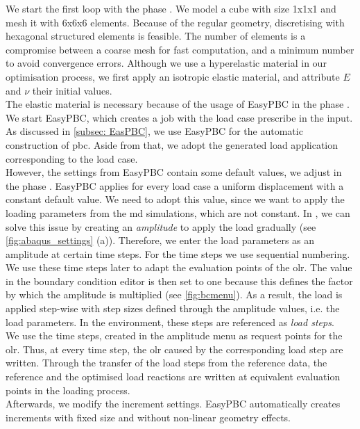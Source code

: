 We start the first loop with the phase . We model a cube with size 1x1x1 and mesh it with 6x6x6 elements. Because of the regular geometry, discretising with hexagonal structured elements is feasible.
The number of elements is a compromise between a coarse mesh for fast computation, and a minimum number to avoid convergence errors.
Although we use a hyperelastic material in our optimisation process, we first apply an isotropic elastic material, and attribute $E$ and $\nu$ their initial values. \\
\indent The elastic material is necessary because of the usage of EasyPBC in the phase .
We start EasyPBC, which creates a job with the load case prescribe in the input.
As discussed in \autoref{subsec: EasPBC}, we use EasyPBC for the automatic construction of \acrshort{pbc}. Aside from that, we adopt the generated load application corresponding to the load case. \\
\indent However, the settings from EasyPBC contain some default values, we adjust in the phase . EasyPBC applies for every load case a uniform displacement with a constant default value.
We need to adopt this value, since we want to apply the loading parameters from the \acrshort{md} simulations, which are not constant.
In , we can solve this issue by creating an \emph{amplitude} to apply the load gradually (see \autoref{fig:abaqus_settings} (a)).
Therefore, we enter the load parameters as an amplitude at certain time steps.
For the time steps we use sequential numbering. We use these time steps later to adapt the evaluation points of the \acrlong{olr}.
The value in the boundary condition editor is then set to one because this defines the factor by which the amplitude is multiplied (see \autoref{fig:bcmenu}).
As a result, the load is applied step-wise with step sizes defined through the amplitude values, i.e. the load parameters. 
In the  environment, these steps are referenced as \emph{load steps}.\\
\indent We use the time steps, created in the amplitude menu as request points for the \acrlong{olr}.
Thus, at every time step, the \acrlong{olr} caused by the corresponding load step are written. 
Through the transfer of the load steps from the reference data, the reference and the optimised load reactions are written at equivalent evaluation points in the loading process.\\
\indent Afterwards, we modify the increment settings.
EasyPBC automatically creates increments with fixed size and without non-linear geometry effects. 
